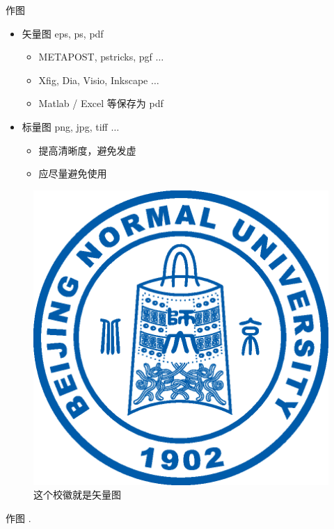 \documentclass{beamer}
\begin{document}
\begin{frame}{作图}
    \begin{itemize}
        \item 矢量图 eps, ps, pdf
        \begin{itemize}
            \item METAPOST, pstricks, pgf $\ldots$
            \item Xfig, Dia, Visio, Inkscape $\ldots$
            \item Matlab / Excel 等保存为 pdf
        \end{itemize}
        \item 标量图 png, jpg, tiff $\ldots$
        \begin{itemize}
            \item 提高清晰度，避免发虚
            \item 应尽量避免使用
        \end{itemize}
    \end{itemize}
    \begin{figure}[htpb]
        \centering
        \includegraphics[width=0.2\linewidth]{pic/Beijing_Normal_University_Logo.eps}
        \caption{这个校徽就是矢量图}
    \end{figure}
\end{frame}

\begin{frame}{作图}
    \ex. \leavevmode\vadjust{\vspace{-\baselineskip}}\newline
    \par
\end{frame}
\end{document}

